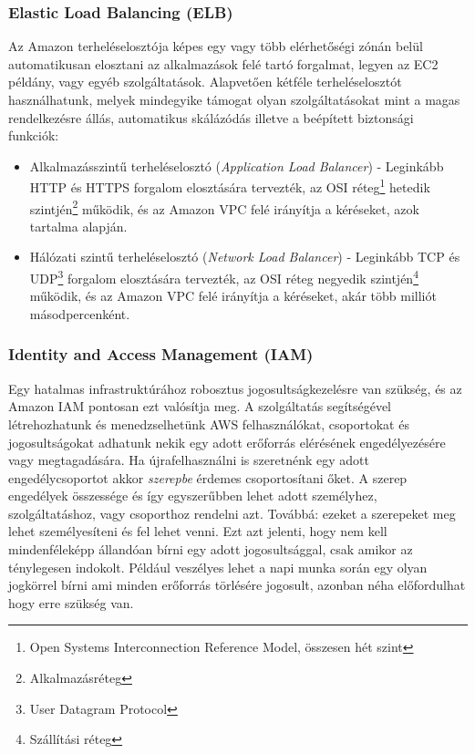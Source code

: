 \subsubsection{Elastic Load Balancing (ELB)}
Az Amazon terheléselosztója képes egy vagy több elérhetőségi zónán belül automatikusan elosztani az alkalmazások felé tartó forgalmat, legyen az EC2 példány, vagy egyéb szolgáltatások. Alapvetően kétféle terheléselosztót használhatunk, melyek mindegyike támogat olyan szolgáltatásokat mint a magas rendelkezésre állás, automatikus skálázódás illetve a beépített biztonsági funkciók:
\begin{itemize}
    \item Alkalmazásszintű terheléselosztó (\textit{Application Load Balancer}) - Leginkább HTTP és HTTPS forgalom elosztására tervezték, az OSI réteg\footnote{Open Systems Interconnection Reference Model, összesen hét szint} hetedik szintjén\footnote{Alkalmazásréteg} működik, és az Amazon VPC felé irányítja a kéréseket, azok tartalma alapján.
    \item Hálózati szintű terheléselosztó (\textit{Network Load Balancer}) - Leginkább TCP és UDP\footnote{User Datagram Protocol} forgalom elosztására tervezték, az OSI réteg negyedik szintjén\footnote{Szállítási réteg} működik, és az Amazon VPC felé irányítja a kéréseket, akár több milliót másodpercenként.
\end{itemize}
\subsubsection{Identity and Access Management (IAM)}
Egy hatalmas infrastruktúrához robosztus jogosultságkezelésre van szükség, és az Amazon IAM pontosan ezt valósítja meg. A szolgáltatás segítségével létrehozhatunk és menedzselhetünk AWS felhasználókat, csoportokat és jogosultságokat adhatunk nekik egy adott erőforrás elérésének engedélyezésére vagy megtagadására. Ha újrafelhasználni is szeretnénk egy adott engedélycsoportot akkor \textit{szerepbe} érdemes csoportosítani őket. A szerep engedélyek összessége és így egyszerűbben lehet adott személyhez, szolgáltatáshoz, vagy csoporthoz rendelni azt. Továbbá: ezeket a szerepeket meg lehet személyesíteni és fel lehet venni. Ezt azt jelenti, hogy nem kell mindenféleképp állandóan bírni egy adott jogosultsággal, csak amikor az ténylegesen indokolt. Például veszélyes lehet a napi munka során egy olyan jogkörrel bírni ami minden erőforrás törlésére jogosult, azonban néha előfordulhat hogy erre szükség van.
